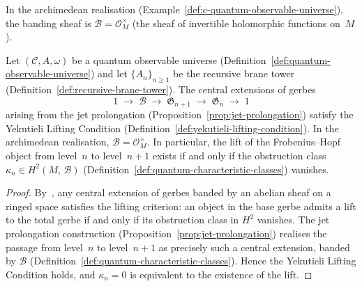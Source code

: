 \begin{remark}
\label{rem:yekutieli-archimedean-band}
In the archimedean realisation
(Example~\ref{def:c-quantum-observable-universe}), the banding sheaf is
$\mathcal{B} = \mathcal{O}_M^{\times}$ (the sheaf of invertible
holomorphic functions on~$M$).
\end{remark}

\begin{proposition}
\label{prop:yekutieli-lifting}
Let $(\mathcal{C}, A, \omega)$ be a quantum observable universe
(Definition~\ref{def:quantum-observable-universe}) and let
$\{A_n\}_{n \geq 1}$ be the recursive brane tower
(Definition~\ref{def:recursive-brane-tower}).  The central extensions of
gerbes
\[
  1 \;\longrightarrow\; \mathcal{B}
  \;\longrightarrow\; \mathfrak{G}_{n+1}
  \;\longrightarrow\; \mathfrak{G}_n
  \;\longrightarrow\; 1
\]
arising from the jet prolongation
(Proposition~\ref{prop:jet-prolongation}) satisfy the Yekutieli Lifting
Condition (Definition~\ref{def:yekutieli-lifting-condition}).  In the
archimedean realisation, $\mathcal{B} = \mathcal{O}_M^{\times}$.  In
particular, the lift of the Frobenius--Hopf object from level~$n$ to
level~$n{+}1$ exists if and only if the obstruction class
$\kappa_n \in H^2(M,\, \mathcal{B})$
(Definition~\ref{def:quantum-characteristic-classes}) vanishes.
\end{proposition}

\begin{proof}
By~\cite[Theorem~1.7]{yekutieli2010}, any central extension of gerbes
banded by an abelian sheaf on a ringed space satisfies the lifting
criterion: an object in the base gerbe admits a lift to the total gerbe
if and only if its obstruction class in $H^2$ vanishes.  The jet
prolongation construction
(Proposition~\ref{prop:jet-prolongation}) realises the passage from
level~$n$ to level~$n{+}1$ as precisely such a central extension,
banded by $\mathcal{B}$
(Definition~\ref{def:quantum-characteristic-classes}).  Hence the
Yekutieli Lifting Condition holds, and $\kappa_n = 0$ is equivalent
to the existence of the lift.
\end{proof}

